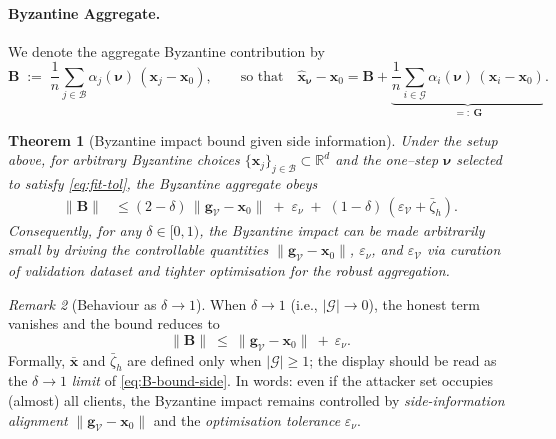 \documentclass{article}
\theoremstyle{plain}
\newtheorem{theorem}{Theorem}[section]
\theoremstyle{definition}
\theoremstyle{remark}
\newtheorem{remark}[theorem]{Remark}
\begin{document}
\paragraph{Byzantine Aggregate.}
We denote the aggregate Byzantine contribution by
\begin{equation*}
	\bm{B}
	\;:=\;
	\frac{1}{n}\sum_{j\in\mathcal{B}} \alpha_j(\bm{\nu})\,(\bm{x}_j-\bm{x}_0),
	\qquad
	\text{so that}\quad
	\hat{\bm{x}}_{\bm{\nu}} - \bm{x}_0
	= \bm{B} + \underbrace{\frac{1}{n}\sum_{i\in\mathcal{G}} \alpha_i(\bm{\nu})\,(\bm{x}_i-\bm{x}_0)}_{=:~\bm{G}}.
\end{equation*}

\begin{center}
\begin{minipage}{\textwidth}
\begin{mdframed}[style=theoremstyle]
\begin{theorem}[Byzantine impact bound given side information]
\label{thm:wc-sideinfo}
Under the setup above, for \emph{arbitrary} Byzantine choices $\{\bm{x}_j\}_{j\in\mathcal{B}} \subset \mathbb{R}^{d}$
and the one–step $\bm{\nu}$ selected to satisfy \eqref{eq:fit-tol}, the Byzantine aggregate
obeys
\begin{align}
	\|\bm{B}\|
	&\le
	(2-\delta)\,\bigl\|\bm{g}_{\mathcal{V}}-\bm{x}_0\bigr\|
	\;+\;
	\varepsilon_\nu
	\;+\;
	(1-\delta)\,(
		\varepsilon_{\mathcal{V}}+\bar{\zeta}_h
	).
\label{eq:B-bound-side}
\end{align}
%
Consequently, for any $\delta \in [0, 1)$, the Byzantine impact can be made
arbitrarily small by driving the controllable quantities
$\|\bm{g}_{\mathcal{V}}-\bm{x}_0\|$, $\varepsilon_\nu$, and $\varepsilon_{\mathcal{V}}$
via curation of validation dataset and tighter optimisation for the robust aggregation.
\end{theorem}
\end{mdframed}
\end{minipage}
\end{center}
%
\begin{center}
\begin{minipage}{\textwidth}
\begin{mdframed}[style=theoremstyle]
\begin{remark}[Behaviour as $\delta\to 1$]\label{rem:delta-to-one}
When $\delta\to 1$ (i.e., $|\mathcal{G}|\to 0$), the honest term vanishes and the bound reduces to
\[
	\|\bm{B}\|\ \le\ \|\bm{g}_{\mathcal V}-\bm{x}_0\|\ +\ \varepsilon_\nu.
\]
Formally, $\bar{\bm x}$ and $\bar\zeta_h$ are defined only when $|\mathcal{G}|\ge1$; the display
should be read as the $\delta\to 1$ \emph{limit} of \eqref{eq:B-bound-side}. In words:
even if the attacker set occupies (almost) all clients, the Byzantine impact remains controlled
by \emph{side-information alignment} $\|\bm{g}_{\mathcal V}-\bm{x}_0\|$ and the
\emph{optimisation tolerance} $\varepsilon_\nu$.
\end{remark}
\end{mdframed}
\end{minipage}
\end{center}
\end{document}

